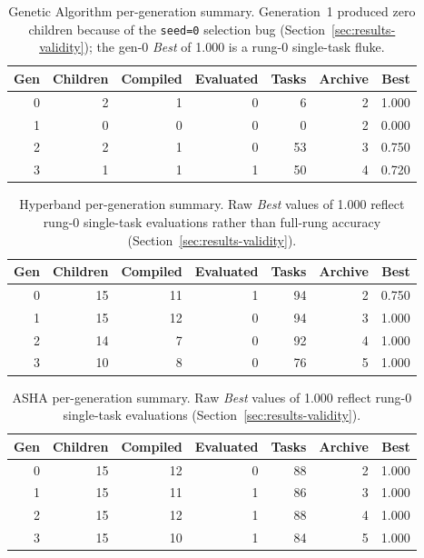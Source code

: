 \begin{table}[ht]
\centering
\caption{Genetic Algorithm per-generation summary. Generation~1 produced
zero children because of the \texttt{seed=0} selection bug
(Section~\ref{sec:results-validity}); the gen-0 \emph{Best} of 1.000 is
a rung-0 single-task fluke.}
\label{tab:appendix-ga}
\begin{tabular}{rrrrrrr}
\hline
Gen & Children & Compiled & Evaluated & Tasks & Archive & Best \\
\hline
0 & 2 & 1 & 0 &  6 & 2 & 1.000 \\
1 & 0 & 0 & 0 &  0 & 2 & 0.000 \\
2 & 2 & 1 & 0 & 53 & 3 & 0.750 \\
3 & 1 & 1 & 1 & 50 & 4 & 0.720 \\
\hline
\end{tabular}
\end{table}

\begin{table}[ht]
\centering
\caption{Hyperband per-generation summary. Raw \emph{Best} values of
1.000 reflect rung-0 single-task evaluations rather than full-rung
accuracy (Section~\ref{sec:results-validity}).}
\label{tab:appendix-hyperband}
\begin{tabular}{rrrrrrr}
\hline
Gen & Children & Compiled & Evaluated & Tasks & Archive & Best \\
\hline
0 & 15 & 11 & 1 & 94 & 2 & 0.750 \\
1 & 15 & 12 & 0 & 94 & 3 & 1.000 \\
2 & 14 &  7 & 0 & 92 & 4 & 1.000 \\
3 & 10 &  8 & 0 & 76 & 5 & 1.000 \\
\hline
\end{tabular}
\end{table}

\begin{table}[ht]
\centering
\caption{ASHA per-generation summary. Raw \emph{Best} values of 1.000
reflect rung-0 single-task evaluations
(Section~\ref{sec:results-validity}).}
\label{tab:appendix-asha}
\begin{tabular}{rrrrrrr}
\hline
Gen & Children & Compiled & Evaluated & Tasks & Archive & Best \\
\hline
0 & 15 & 12 & 0 & 88 & 2 & 1.000 \\
1 & 15 & 11 & 1 & 86 & 3 & 1.000 \\
2 & 15 & 12 & 1 & 88 & 4 & 1.000 \\
3 & 15 & 10 & 1 & 84 & 5 & 1.000 \\
\hline
\end{tabular}
\end{table}


